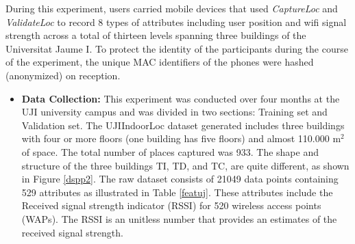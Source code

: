 \documentclass[../UNBThesis2.tex]{subfiles}
\begin{document}
During this experiment, users carried mobile devices that used \textit{CaptureLoc} and \textit{ValidateLoc} to record 8 types of attributes including user position and wifi signal strength across a total of thirteen levels spanning three buildings of the Universitat Jaume I. To protect the identity of the participants during the course of the experiment, the unique MAC identifiers of the phones were hashed (anonymized) on reception.
\begin{itemize}

\item\textbf{Data Collection:}
This experiment was conducted over four months at the UJI university campus and was divided in two sections: Training set and Validation set. The UJIIndoorLoc dataset generated includes three buildings with four or more floors (one building has five floors) and almost 110.000 m$^{2}$of space. The total number of places captured was 933. The shape and structure of the three buildings TI, TD, and TC, are quite different, as shown in Figure \ref{dspp2}. The raw dataset consists of 21049 data points containing 529 attributes as illustrated in Table \ref{featuj}. These attributes include the Received signal strength indicator (RSSI) for 520 wireless access points (WAPs). The RSSI is an unitless number that provides an estimates of the  received signal strength.



\end{itemize}
\end{document}
